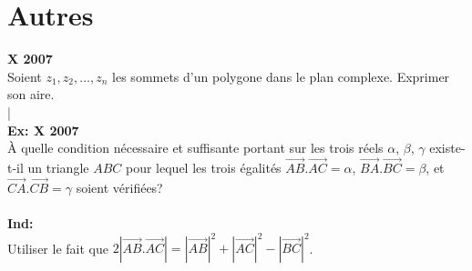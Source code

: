 \documentclass{article}
\begin{document}
\section{Autres}
\textbf{X 2007}\\
Soient $z_1, z_2, \dots, z_n$ les sommets d'un polygone dans le plan complexe. Exprimer son aire.\\
|\\
\textbf{Ex: X 2007}\\
\`A quelle condition n\'ecessaire et suffisante portant sur les trois r\'eels $\alpha$, $\beta$, $\gamma$ existe-t-il un triangle $ABC$ pour lequel les trois \'egalit\'es $\overrightarrow{AB}.\overrightarrow{AC}=\alpha$, $\overrightarrow{BA}.\overrightarrow{BC}=\beta$, et $\overrightarrow{CA}.\overrightarrow{CB}=\gamma$ soient v\'erifi\'ees?\\
\\
\textbf{Ind:}\\
Utiliser le fait que $2|\overrightarrow{AB}.\overrightarrow{AC}|=|\overrightarrow{AB}|^2+|\overrightarrow{AC}|^2-|\overrightarrow{BC}|^2$.
\end{document}
